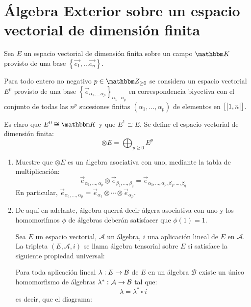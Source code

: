\documentclass[../variedades_diferenciables_I.tex]{subfiles}
\begin{document}
    \chapter{Álgebra Exterior sobre un espacio vectorial de dimensión finita}

    \setcounter{section}{1}

    \begin{excer}[Ejercicio 19]
        Sea $E$ un espacio vectorial de dimensión finita sobre un campo $\bbm{K}$ provisto de una base $\left\{\vec{e_1},\dots\vec{e_n} \right\}$.

        Para todo entero no negativo $p\in\bbm{Z}_{\geq0}$ se considera un espacio vectorial $E^p$ provisto de una base $\left\{\vec{e}_{\alpha_1,\dots\alpha_p}\right\}_{\alpha_1\cdots\alpha_p}$ en correspondencia biyectiva con el conjunto de todas las $n^p$ sucesiones finitas $\left(\alpha_1,\dots,\alpha_p\right)$ de elementos en $\left[\big|1,n\big|\right]$.

        Es claro que $E^0\cong\bbm{K}$ y que $E^1\cong E$. Se define el espacio vectorial de dimensión finita:
        \begin{equation*}
            \otimes E=\bigoplus_{ p\geq0}E^p
        \end{equation*}

        \begin{enumerate}[label = \textit{(\alph*)}]
            \item Muestre que $\otimes E$ es un álgebra asociativa con uno, mediante la tabla de multiplicación:
            \begin{equation*}
                \vec{e}_{\alpha_1,\dots,\alpha_p}\otimes \vec{e}_{\beta_1,\dots,\beta_q}=\vec{e}_{\alpha_1,\dots,\alpha_p,\beta_1,\dots,\beta_q}
            \end{equation*}
            En particular, $\vec{e}_{\alpha_1,\dots,\alpha_p}=\vec{e}_{\alpha_1}\otimes\cdots\otimes\vec{e}_{\alpha_p}$.
            \item De aquí en adelante, álgebra querrá decir álgera asociativa con uno y los homomorifmos $\phi$ de álgebras deberán satisfacer que $\phi(1)=1$.
            
            Sea $E$ un espacio vectorial, $\mathcal{A}$ un álgebra, $i$ una aplicación lineal de $E$ en $\mathcal{A}$. La tripleta $\left(E,\mathcal{A},i\right)$ se llama álgebra tensorial sobre $E$ si satisface la siguiente propiedad universal:

            \begin{mydef}
                Para toda aplicación lineal $\lambda:E\rightarrow\mathcal{B}$ de $E$ en un álgebra $\mathcal{B}$ existe un único homomorfismo de álgebras $\lambda^*:\mathcal{A}\rightarrow\mathcal{B}$ tal que:
                \begin{equation*}
                    \lambda=\lambda^*\circ i
                \end{equation*}
                es decir, que el diagrama:
                

\end{mydef}
\end{enumerate}
\end{excer}
\end{document}
